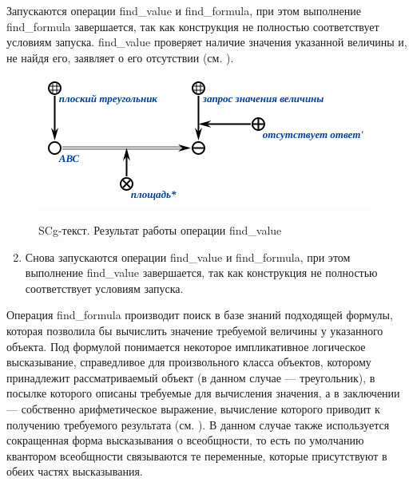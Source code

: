 Запускаются операции find\_value и find\_formula, при этом выполнение find\_formula завершается, так как конструкция не полностью соответствует условиям запуска. find\_value проверяет наличие значения указанной величины и, не найдя его, заявляет о его отсутствии (см. ).

\begin{figure}[H]
	\caption{SCg-текст. Результат работы операции find\_value}
	\includegraphics[scale=0.85]{images/part7/chapter_learning_systems/step2-kbe.png}
	\label{fig:step2}
\end{figure}

\begin{enumerate}
	\setcounter{enumi}{1}
	\item
	Снова запускаются операции find\_value и find\_formula, при этом выполнение find\_value завершается, так как конструкция не полностью соответствует условиям запуска.
\end{enumerate}

Операция find\_formula производит поиск в базе знаний подходящей формулы, которая позволила бы вычислить значение требуемой величины у указанного объекта. Под формулой понимается некоторое импликативное логическое высказывание, справедливое для произвольного класса объектов, которому принадлежит рассматриваемый объект (в данном случае --- треугольник), в посылке которого описаны требуемые для вычисления значения, а в заключении --- собственно арифметическое выражение, вычисление которого приводит к получению требуемого результата (см. ). В данном случае также используется сокращенная форма высказывания о всеобщности, то есть по умолчанию квантором всеобщности связываются те переменные, которые присутствуют в обеих частях высказывания.

